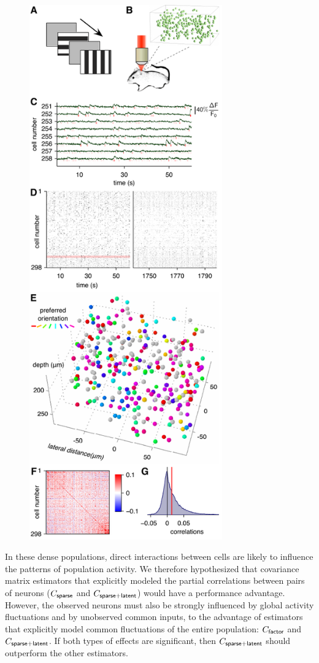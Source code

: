 \documentclass[10pt]{article}
\begin{document}
\begin{figure}
    {\includegraphics[width=8.3cm]{figures/Figure03.pdf}}
\end{figure}

In these dense populations, direct interactions between cells are likely to influence the patterns of population activity.  We therefore hypothesized that covariance matrix estimators that explicitly modeled the partial correlations between pairs of neurons ($C_{\sf sparse}$ and $C_{\sf sparse+latent}$) would have a performance advantage.  However, the observed neurons must also be strongly influenced by global activity fluctuations and by unobserved common inputs, to the advantage of estimators that explicitly model common fluctuations of the entire population: $C_{\sf factor}$ and $C_{\sf sparse+latent}$.  If both types of effects are significant, then $C_{\sf sparse+latent}$ should outperform the other estimators.
\end{document}
